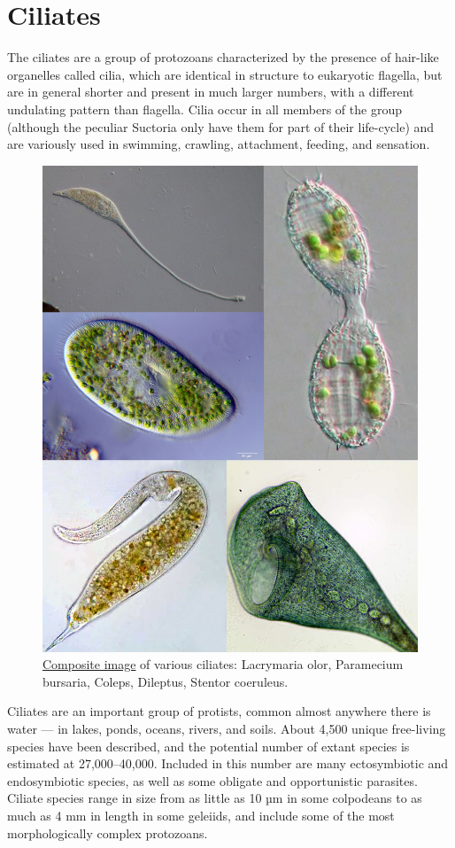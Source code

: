 \hypertarget{ciliates}{%
\section{Ciliates}\label{ciliates}}

The ciliates are a group of protozoans characterized by the presence of hair-like organelles called cilia, which are identical in structure to eukaryotic flagella, but are in general shorter and present in much larger numbers, with a different undulating pattern than flagella. Cilia occur in all members of the group (although the peculiar Suctoria only have them for part of their life-cycle) and are variously used in swimming, crawling, attachment, feeding, and sensation.



\begin{figure}

{\centering \includegraphics[width=0.7\linewidth]{./figures/protista/Ciliate_collage} 

}

\caption{\href{https://commons.wikimedia.org/wiki/File:Ciliate_collage.jpg}{Composite image} of various ciliates: Lacrymaria olor, Paramecium bursaria, Coleps, Dileptus, Stentor coeruleus.}\label{fig:ciliata}
\end{figure}

Ciliates are an important group of protists, common almost anywhere there is water --- in lakes, ponds, oceans, rivers, and soils. About 4,500 unique free-living species have been described, and the potential number of extant species is estimated at 27,000--40,000. Included in this number are many ectosymbiotic and endosymbiotic species, as well as some obligate and opportunistic parasites. Ciliate species range in size from as little as 10 µm in some colpodeans to as much as 4 mm in length in some geleiids, and include some of the most morphologically complex protozoans.

